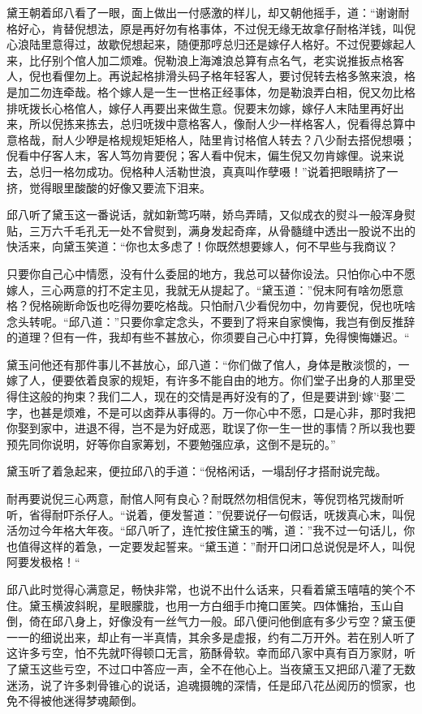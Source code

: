\documentclass[12pt,UTF8]{ctexbook}
\begin{document}
{{{黛王朝着邱八看了一眼，面上做出一付感激的样儿，却又朝他摇手，道：“谢谢耐格好心，肯替倪想法，原是再好勿有格事体，不过倪无缘无故拿仔耐格洋钱，叫倪心浪陆里意得过，故歇倪想起来，随便那哼总归还是嫁仔人格好。不过倪要嫁起人来，比仔别个倌人加二烦难。倪勒浪上海滩浪总算有点名气，老实说推扳点格客人，倪也看俚勿上。再说起格排滑头码子格年轻客人，要讨倪转去格多煞来浪，格是加二勿连牵哉。格个嫁人是一生一世格正经事体，勿是勒浪弄白相，倪又勿比格排呒拨长心格倌人，嫁仔人再要出来做生意。倪要末勿嫁，嫁仔人末陆里再好出来，所以倪拣来拣去，总归呒拨中意格客人，像耐人少一样格客人，倪看得总算中意格哉，耐人少咿是格规规矩矩格人，陆里肯讨格倌人转去？八少耐去搭倪想嗫；倪看中仔客人末，客人笃勿肯要倪；客人看中倪末，偏生倪又勿肯嫁俚。说来说去，总归一格勿成功。倪格种人活勒世浪，真真叫作孽嗫！”说着把眼睛挤了一挤，觉得眼里酸酸的好像又要流下泪来。

邱八听了黛玉这一番说话，就如新莺巧啭，娇鸟弄晴，又似成衣的熨斗一般浑身熨贴，三万六千毛孔无一处不曾熨到，满身发起奇痒，从骨髓缝中透出一股说不出的快活来，向黛玉笑道：“你也太多虑了！你既然想要嫁人，何不早些与我商议？

只要你自己心中情愿，没有什么委屈的地方，我总可以替你设法。只怕你心中不愿嫁人，三心两意的打不定主见，我就无从提起了。“黛玉道：”倪末阿有啥勿愿意格？倪格碗断命饭也吃得勿要吃格哉。只怕耐八少看倪勿中，勿肯要倪，倪也呒啥念头转呢。“邱八道：”只要你拿定念头，不要到了将来自家懊悔，我岂有倒反推辞的道理？但有一件，我却有些不甚放心，你须要自己心中打算，免得懊悔嫌迟。“

黛玉问他还有那件事儿不甚放心，邱八道：“你们做了倌人，身体是散淡惯的，一嫁了人，便要依着良家的规矩，有许多不能自由的地方。你们堂子出身的人那里受得住这般的拘束？我们二人，现在的交情是再好没有的了，但是要讲到‘嫁’‘娶’二字，也甚是烦难，不是可以卤莽从事得的。万一你心中不愿，口是心非，那时我把你娶到家中，进退不得，岂不是为好成恶，耽误了你一生一世的事情？所以我也要预先同你说明，好等你自家筹划，不要勉强应承，这倒不是玩的。”

黛玉听了着急起来，便拉邱八的手道：“倪格闲话，一塌刮仔才搭耐说完哉。

耐再要说倪三心两意，耐倌人阿有良心？耐既然勿相信倪末，等倪罚格咒拨耐听听，省得耐吓杀仔人。“说着，便发誓道：”倪要说仔一句假话，呒拨真心末，叫倪活勿过今年格大年夜。“邱八听了，连忙按住黛玉的嘴，道：”我不过一句话儿，你也值得这样的着急，一定要发起誓来。“黛玉道：”耐开口闭口总说倪是坏人，叫倪阿要发极格！“

邱八此时觉得心满意足，畅快非常，也说不出什么话来，只看着黛玉嘻嘻的笑个不住。黛玉横波斜睨，星眼朦胧，也用一方白细手巾掩口匿笑。四体慵抬，玉山自倒，倚在邱八身上，好像没有一丝气力一般。邱八便问他倒底有多少亏空？黛玉便一一的细说出来，却止有一半真情，其余多是虚报，约有二万开外。若在别人听了这许多亏空，怕不先就吓得顿口无言，筋酥骨软。幸而邱八家中真有百万家财，听了黛玉这些亏空，不过口中答应一声，全不在他心上。当夜黛玉又把邱八灌了无数迷汤，说了许多刺骨锥心的说话，追魂摄魄的深情，任是邱八花丛阅历的惯家，也免不得被他迷得梦魂颠倒。

}}}
\end{document}
